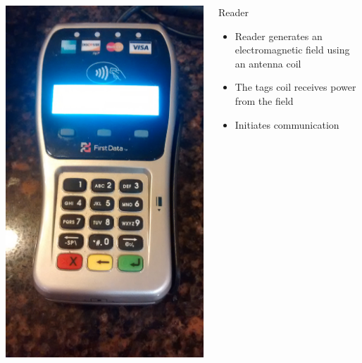 \documentclass[unknownkeysallowed]{beamer}
\begin{document}
\begin{frame}
  \begin{columns}[T]
    \begin{column}{.5\textwidth}\centering
        \vspace{3mm}
        \includegraphics[width=\linewidth,height=0.2\textheight,keepaspectratio]{figures/higbies.jpg}
    \end{column}
    \begin{column}{.5\textwidth}
      \begin{block}{Reader}
	       \begin{itemize}
          \item{Reader generates an electromagnetic field using an antenna coil}
          \item{The tags coil receives power from the field}
          \item{Initiates communication}
         \end{itemize}
       \end{block}
    \end{column}
  \end{columns}
\end{frame}
\end{document}
